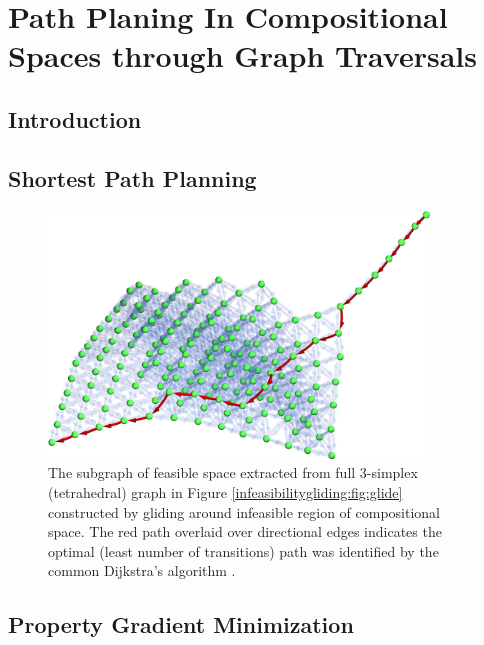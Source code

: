 \chapter{Path Planing In Compositional Spaces through Graph Traversals} \label{chap:pathplanning}


\section{Introduction} \label{pathplan:sec:intro}

\todo


\section{Shortest Path Planning} \label{pathplan:sec:shortest}

\todo

\begin{figure}[H]
    \centering
    \includegraphics[width=0.9\textwidth]{pathplanning/InfeasibilityGliding_Feasible.png}
    \caption{The subgraph of feasible space extracted from full 3-simplex (tetrahedral) graph in Figure \ref{infeasibilitygliding:fig:glide} constructed by gliding around infeasible region of compositional space. The red path overlaid over directional edges indicates the optimal (least number of transitions) path was identified by the common Dijkstra's algorithm \cite{Dijkstra1959AGraphs}.}
    \label{pathplan:fig:shortestpath}
\end{figure}

\section{Property Gradient Minimization} \label{pathplan:sec:gradientmin}


